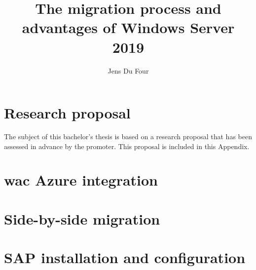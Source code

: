 \documentclass{bachproef-tin}
\title{The migration process and advantages of Windows Server 2019}
\author{Jens Du Four}
\begin{document}
	
\inserttitlepage
\usechapterimagefalse


\pagestyle{empty} %
\tableofcontents  %
\cleardoublepage  %
\pagestyle{fancy} %
\listoffigures
\listoftables
\printnoidxglossaries





\appendix
\renewcommand{\chaptername}{Appendix} 
\chapter{Research proposal}
The subject of this bachelor's thesis is based on a research proposal that has been assessed in advance by the promoter. This proposal is included in this Appendix.

\chapter{\acrlong{wac} Azure integration}

\chapter{Side-by-side migration}

\chapter{SAP installation and configuration}

\end{document}
